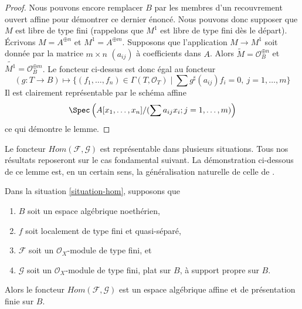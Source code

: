 \begin{proof}
\medskip\noindent
Nous pouvons encore remplacer $B$ par les membres d'un recouvrement ouvert
affine pour démontrer ce dernier énoncé. Nous pouvons donc supposer que $M$
est libre de type fini (rappelons que $M^1$ est libre de type fini dès le
départ). Écrivons $M = A^{\oplus n}$ et $M^1 = A^{\oplus m}$. Supposons que
l'application $M \to M^1$ soit donnée par la matrice $m \times n$
$(a_{ij})$ à coefficients dans $A$. Alors
$\widetilde{M} = \mathcal{O}_B^{\oplus n}$ et
$\widetilde{M^1} = \mathcal{O}_B^{\oplus m}$. Le foncteur ci-dessus est donc
égal au foncteur
$$
(g : T \to B) \longmapsto
\{(f_1, \ldots, f_n) \in \Gamma(T, \mathcal{O}_T) \mid
\sum g^\sharp(a_{ij})f_i = 0,\ j = 1, \ldots, m\}
$$
Il est clairement représentable par le schéma affine
$$
\Spec\left(A[x_1, \ldots, x_n]/(\sum a_{ij}x_i; j = 1, \ldots, m)\right)
$$
ce qui démontre le lemme.
\end{proof}

\noindent
Le foncteur $\mathit{Hom}(\mathcal{F}, \mathcal{G})$ est représentable dans
plusieurs situations. Tous nos résultats reposeront sur le cas fondamental
suivant. La démonstration ci-dessous de ce lemme est, en un certain sens, la
généralisation naturelle de celle de \cite[III, Cor 7.7.8]{EGA}.

\begin{lemma}
\label{lemma-noetherian-hom}
Dans la situation \ref{situation-hom}, supposons que
\begin{enumerate}
\item $B$ soit un espace algébrique noethérien,
\item $f$ soit localement de type fini et quasi-séparé,
\item $\mathcal{F}$ soit un $\mathcal{O}_X$-module de type fini, et
\item $\mathcal{G}$ soit un $\mathcal{O}_X$-module de type fini, plat sur
$B$, à support propre sur $B$.
\end{enumerate}
Alors le foncteur $\mathit{Hom}(\mathcal{F}, \mathcal{G})$ est un espace
algébrique affine et de présentation finie sur $B$.
\end{lemma}

